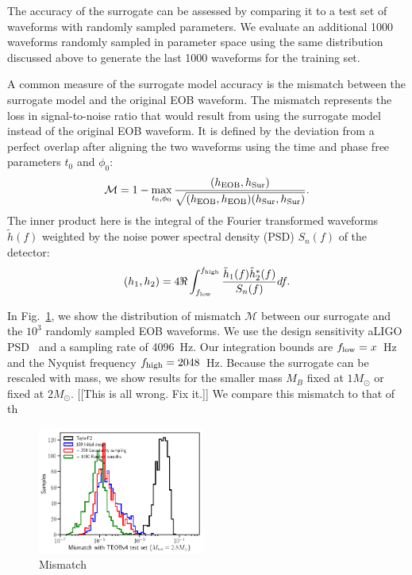 \documentclass[prd,aps,letter,twocolumn,floatfix,notitlepage,nofootinbib]{revtex4-1}
\begin{document}
The accuracy of the surrogate can be assessed by comparing it to a test set of waveforms with randomly sampled parameters. We evaluate an additional 1000 waveforms randomly sampled in parameter space using the same distribution discussed above to generate the last 1000 waveforms for the training set.

A common measure of the surrogate model accuracy is the mismatch between 
the surrogate model and the original EOB waveform.
The mismatch represents the loss in signal-to-noise ratio that would result 
from using the surrogate model instead of the original EOB waveform. 
It is defined by the deviation from a perfect overlap after aligning the two waveforms
using the time and phase free parameters $t_0$ and $\phi_0$:
\begin{equation}
\mathcal{M} = 1 - \max_{t_0, \phi_0} \frac{(h_{\rm EOB}, h_{\rm Sur})} {\sqrt{(h_{\rm EOB}, h_{\rm EOB}) (h_{\rm Sur}, h_{\rm Sur})}}.
\end{equation}
The inner product here  is the integral of the Fourier transformed waveforms $\tilde h(f)$ weighted by the noise power spectral 
density (PSD) $S_n(f)$ of the detector:
\begin{equation}
(h_1, h_2) = 4 \Re \int_{f_{\rm low}}^{f_{\rm high}} \frac{\tilde h_1(f) \tilde h^*_2(f)} {S_n(f)} df.
\end{equation}

In Fig.~\ref{fig:mismatch}, we show the distribution of mismatch $\mathcal{M}$ between our surrogate
and the $10^3$ randomly sampled EOB waveforms. We use the design sensitivity aLIGO PSD~\cite{Aasi:2013wya} and
a sampling rate of 4096~Hz. Our integration bounds are $f_{\rm low} = x$~Hz and the Nyquist frequency
$f_{\rm high} = 2048$~Hz. Because the surrogate can be rescaled with mass,
we show results for the smaller mass $M_B$ fixed at $1M_\odot$ or fixed at $2M_\odot$.
[[This is all wrong. Fix it.]]
We compare this mismatch to that of th

\begin{figure}[htb]
\centering
\includegraphics[width=0.49\textwidth]{mismatch.png}
\caption{Mismatch}
\label{fig:mismatch}
\end{figure}
\end{document}

